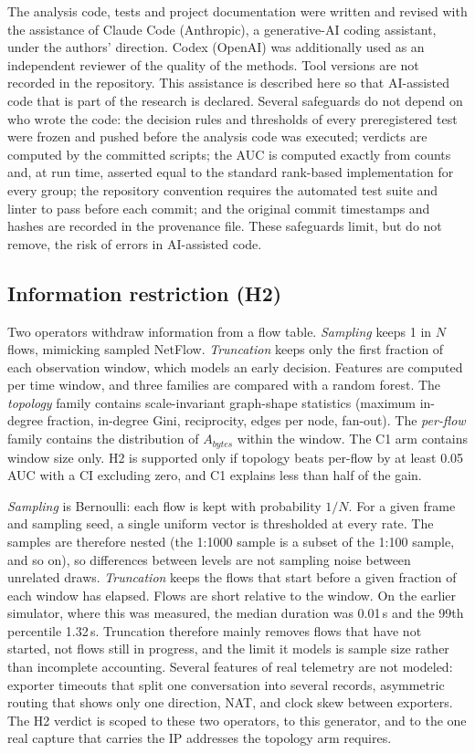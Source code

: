 \documentclass[preprint,12pt]{elsarticle}
\begin{document}
The analysis code, tests and project documentation were written and revised with the assistance of Claude Code (Anthropic), a generative-AI coding assistant, under the authors' direction. Codex (OpenAI) was additionally used as an independent reviewer of the quality of the methods. Tool versions are not recorded in the repository. This assistance is described here so that AI-assisted code that is part of the research is declared. Several safeguards do not depend on who wrote the code: the decision rules and thresholds of every preregistered test were frozen and pushed before the analysis code was executed; verdicts are computed by the committed scripts; the AUC is computed exactly from counts and, at run time, asserted equal to the standard rank-based implementation for every group; the repository convention requires the automated test suite and linter to pass before each commit; and the original commit timestamps and hashes are recorded in the provenance file. These safeguards limit, but do not remove, the risk of errors in AI-assisted code.

\subsection{Information restriction (H2)}\label{sec:h2methods}

Two operators withdraw information from a flow table. \emph{Sampling} keeps 1 in $N$ flows, mimicking sampled NetFlow. \emph{Truncation} keeps only the first fraction of each observation window, which models an early decision. Features are computed per time window, and three families are compared with a random forest. The \emph{topology} family contains scale-invariant graph-shape statistics (maximum in-degree fraction, in-degree Gini, reciprocity, edges per node, fan-out). The \emph{per-flow} family contains the distribution of $A_{bytes}$ within the window. The C1 arm contains window size only. H2 is supported only if topology beats per-flow by at least 0.05 AUC with a CI excluding zero, and C1 explains less than half of the gain.

\emph{Sampling} is Bernoulli: each flow is kept with probability $1/N$. For a given frame and sampling seed, a single uniform vector is thresholded at every rate. The samples are therefore nested (the 1:1000 sample is a subset of the 1:100 sample, and so on), so differences between levels are not sampling noise between unrelated draws. \emph{Truncation} keeps the flows that start before a given fraction of each window has elapsed. Flows are short relative to the window. On the earlier simulator, where this was measured, the median duration was 0.01\,s and the 99th percentile 1.32\,s. Truncation therefore mainly removes flows that have not started, not flows still in progress, and the limit it models is sample size rather than incomplete accounting. Several features of real telemetry are not modeled: exporter timeouts that split one conversation into several records, asymmetric routing that shows only one direction, NAT, and clock skew between exporters. The H2 verdict is scoped to these two operators, to this generator, and to the one real capture that carries the IP addresses the topology arm requires.
\end{document}
